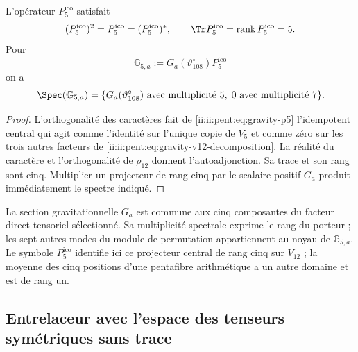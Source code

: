 \begin{theorem}
\label{ii:ii:pent:thm:gravity-p5-coupling}
L'opérateur \(P^{\mathrm{ico}}_5\) satisfait
\begin{equation}
\label{ii:ii:pent:eq:gravity-p5-properties}
(P^{\mathrm{ico}}_5)^2=P^{\mathrm{ico}}_5=(P^{\mathrm{ico}}_5)^*,
\qquad \Tr P^{\mathrm{ico}}_5=\operatorname{rank} P^{\mathrm{ico}}_5=5.
\end{equation}
Pour
\begin{equation}
\label{ii:ii:pent:eq:gravity-G5}
\mathbb G_{5,a}:=G_a(\vartheta^\circ_{108})P^{\mathrm{ico}}_5
\end{equation}
on a
\begin{equation}
\label{ii:ii:pent:eq:gravity-G5-spectrum}
\Spec(\mathbb G_{5,a})
=\{G_a(\vartheta^\circ_{108})\text{ avec multiplicité }5,
\;0\text{ avec multiplicité }7\}.
\end{equation}
\end{theorem}

\begin{proof}
L’orthogonalité des caractères fait de \eqref{ii:ii:pent:eq:gravity-p5}
l’idempotent central qui agit comme l’identité sur l’unique copie de
\(V_5\) et comme zéro sur les trois autres facteurs de
\eqref{ii:ii:pent:eq:gravity-v12-decomposition}. La réalité du caractère et
l’orthogonalité de \(\rho_{12}\) donnent l’autoadjonction. Sa trace et son rang
sont cinq. Multiplier un projecteur de rang cinq par le scalaire positif
\(G_a\) produit immédiatement le spectre indiqué.
\end{proof}

La section gravitationnelle \(G_a\) est commune aux cinq composantes du
facteur direct tensoriel sélectionné. Sa multiplicité spectrale exprime le
rang du porteur ; les sept autres modes du module de permutation
appartiennent au noyau de \(\mathbb G_{5,a}\). Le symbole
\(P^{\mathrm{ico}}_5\) identifie ici ce projecteur central de rang
cinq sur \(V_{12}\) ; la moyenne des cinq positions d’une
pentafibre arithmétique a un autre domaine et est de rang un.

\subsection{Entrelaceur avec l’espace des tenseurs symétriques sans trace}

